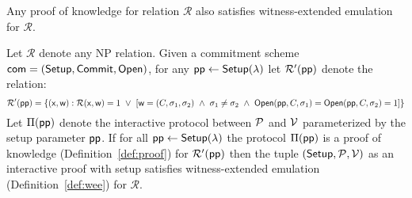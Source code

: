 \begin{lemma}\label{lem:wee}
	Any proof of knowledge for relation $\mathcal{R}$ also satisfies witness-extended emulation for $\mathcal{R}$.  
\end{lemma}

\begin{lemma}\label{lem:weecommit}

Let $\mathcal{R}$ denote any NP relation. Given a commitment scheme $\textsf{com} = (\textsf{{Setup}}, \textsf{{Commit}}, \textsf{{Open}})$, for any $\textsf{pp} \gets \textsf{{Setup}}(\lambda)$ let $\mathcal{R}'(\textsf{pp})$ denote the relation: 
$$\mathcal{R'}(\crs) = \{(\mathsf{x}, \mathsf{w}): \mathcal{R}(\mathsf{x}, \mathsf{w}) = 1 \  \vee \ \left[ \mathsf{w} = (C, \sigma_1, \sigma_2) \ \wedge \ \sigma_1 \neq \sigma_2 \ \wedge \ \open(\crs, C, \sigma_1) = \open(\crs, C, \sigma_2) = 1 \right]   \} $$
Let $\Pi(\textsf{pp})$ denote the interactive protocol between $\mathcal{P}$ and $\mathcal{V}$ parameterized by the setup parameter $\textsf{pp}$. If for all $\textsf{pp} \gets  \textsf{{Setup}}(\lambda)$ the protocol $\Pi(\textsf{pp})$ is a proof of knowledge (Definition~\ref{def:proof}) for $\mathcal{R}'(\textsf{pp})$ then the tuple $(\textsf{{Setup}}, \mathcal{P}, \mathcal{V})$ as an interactive proof with setup satisfies witness-extended emulation (Definition~\ref{def:wee}) for $\mathcal{R}$. 	
\end{lemma}

